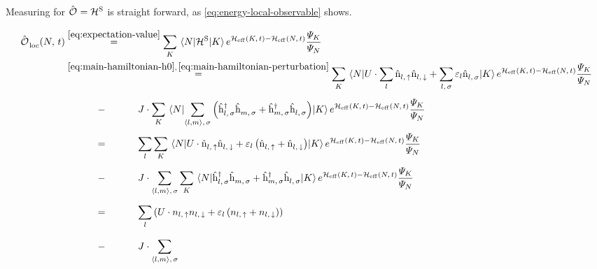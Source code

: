 Measuring  for $\ObservableOp = \pictureHamiltonian[\schroedingerPicture]$ is straight forward, as \autoref{eq:energy-local-observable} shows.

\begin{equation}
    \label{eq:energy-local-observable}
    \begin{split}
        \localObservable{N}{t} &\stackrel{\ref{eq:expectation-value}}{=}
        \lsum[K] \bracketHelper{N}{\pictureHamiltonian[\schroedingerPicture]}{K} e^{\HeffOft[K]-\HeffOft[N]}
        \frac{
            \psiN[K]
        }{
            \psiN[N]
        } \\
        &\stackrel{\ref{eq:main-hamiltonian-h0},\,\ref{eq:main-hamiltonian-perturbation}}{=}
        \lsum[K] \bracketHelper{N}{U \cdot \lsum \nop{l}{\up}\nop{l}{\down} + \lsum[l,\,\sigma] \epsl \nop{l}{\sigma}}{K} e^{\HeffOft[K]-\HeffOft[N]}
        \frac{
            \psiN[K]
        }{
            \psiN[N]
        }
        \\&\stackrel{\phantom{\ref{eq:base-energy}}}{-}
        J \cdot 
        \lsum[K] \bracketHelper{N}{\neighborsumWSpin{l}{m}{\sigma} \left(\withspinhcop{l}{\sigma}{\dagger} \withspinhcop{m}{\sigma}{} + \withspinhcop{m}{\sigma}{\dagger} \withspinhcop{l}{\sigma}{} \right)}{K} e^{\HeffOft[K]-\HeffOft[N]}
        \frac{
            \psiN[K]
        }{
            \psiN[N]
        }
        \\&\stackrel{\phantom{\ref{eq:base-energy}}}{=}
        \lsum \lsum[K] \bracketHelper{N}{U \cdot  \nop{l}{\up}\nop{l}{\down} + \epsl \left(\nop{l}{\up} + \nop{l}{\down}\right)}{K} e^{\HeffOft[K]-\HeffOft[N]}
        \frac{
            \psiN[K]
        }{
            \psiN[N]
        }
        \\&\stackrel{\phantom{\ref{eq:base-energy}}}{-}
        J \cdot \neighborsumWSpin{l}{m}{\sigma}
        \lsum[K] \bracketHelper{N}{ \withspinhcop{l}{\sigma}{\dagger} \withspinhcop{m}{\sigma}{} + \withspinhcop{m}{\sigma}{\dagger} \withspinhcop{l}{\sigma}{} }{K} e^{\HeffOft[K]-\HeffOft[N]}
        \frac{
            \psiN[K]
        }{
            \psiN[N]
        }
        \\&\stackrel{\phantom{\ref{eq:base-energy}}}{=}
        \lsum \left(U \cdot  n_{l,\,\up}n_{l,\,\down} + \epsl \left(n_{l,\,\up} + n_{l,\,\down}\right)\right)
        \\&\stackrel{\phantom{\ref{eq:base-energy}}}{-}
        J \cdot \neighborsumWSpin{l}{m}{\sigma}

\end{split}
\end{equation}

